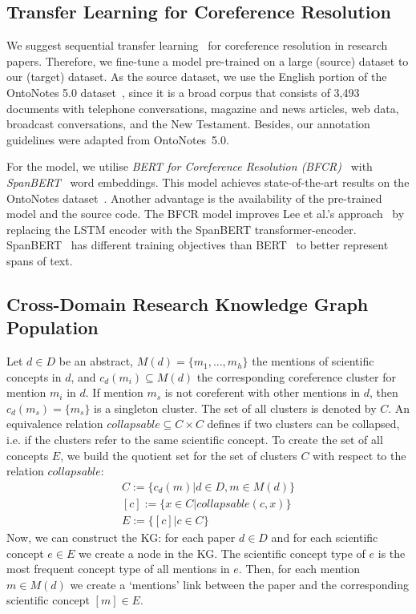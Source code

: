 \documentclass[runningheads]{llncs}
\begin{document}
\subsection{Transfer Learning for Coreference Resolution}

We suggest sequential transfer learning~\cite{Ruder2019Neural} for coreference resolution in research papers. Therefore, we fine-tune a model pre-trained on a large (source) dataset to our (target) dataset. 
As the source dataset, we use the English portion of the OntoNotes 5.0 dataset~\cite{Pradhan2013TowardsRL}, since it is a broad corpus that consists of 3,493 documents with telephone conversations, magazine and news articles, web data, broadcast conversations, and the New Testament. Besides, our annotation guidelines were adapted from OntoNotes~5.0.

For the model, we utilise \emph{BERT for Coreference Resolution (BFCR)}~\cite{Joshi2020BFCR} with \emph{SpanBERT}~\cite{Joshi2020SpanBERT} word embeddings. This model achieves state-of-the-art results on the Onto\-Notes dataset~\cite{Joshi2020SpanBERT}. Another advantage is the availability of the pre-trained model and the source code.
The BFCR model improves Lee et al.'s approach~\cite{LeeHZ18Coreference} by replacing the LSTM encoder with the SpanBERT transformer-encoder. SpanBERT~\cite{Joshi2020SpanBERT} has different training objectives than BERT~\cite{Devlin2018BERTPO} to better represent spans of text.


\subsection{Cross-Domain Research Knowledge Graph Population}
\label{sec:kg_construction_approach}

Let $d \in D$ be an abstract, $M(d) = \{m_1, ..., m_h\}$ the mentions of scientific concepts in $d$, and $c_d(m_i) \subseteq M(d)$ the corresponding coreference cluster for mention $m_i$ in $d$. If mention $m_s$ is not coreferent with other mentions in $d$, then $c_d(m_s) = \{m_s\}$ is a singleton cluster. The set of all clusters is denoted by $C$.
An equivalence relation $collapsable \subseteq C\times C$ defines if two clusters can be collapsed, i.e. if the clusters refer to the same scientific concept. 
To create the set of all concepts $E$, we build the quotient set for the set of clusters $C$ with respect to the relation $collapsable$:
\begin{eqnarray}
C := \{c_d(m) | d \in D, m \in M(d)\} \\
{[c]} := \{x \in C | collapsable(c, x)\} \\
E := \{[c] | c \in C\} 
\end{eqnarray}
Now, we can construct the KG:
for each paper $d \in D$ and for each scientific concept $e \in E$ we create a node in the KG.
The scientific concept type of $e$ is the most frequent concept type of all mentions in $e$.
Then, for each mention $m \in M(d)$ we create a `mentions' link between the paper and the corresponding scientific concept $[m] \in E$.
\end{document}

